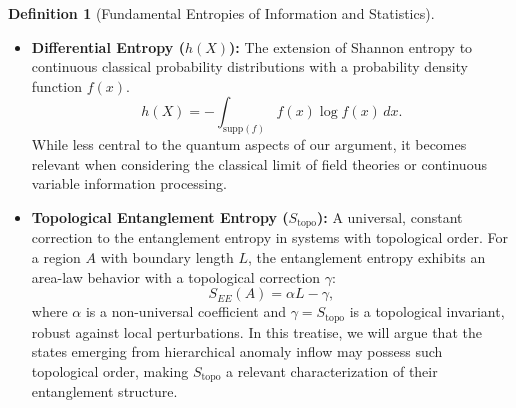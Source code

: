 \documentclass[11pt, letterpaper]{report}
\theoremstyle{plain} %
\theoremstyle{definition} %
\newtheorem{definition}{Definition}[chapter]
\theoremstyle{remark} %
\begin{document}
\begin{definition}[Fundamental Entropies of Information and Statistics]
\begin{itemize}
    \item \textbf{Differential Entropy ($h(X)$):} The extension of Shannon entropy to continuous classical probability distributions with a probability density function $f(x)$.
    \begin{equation}
        h(X) = -\int_{\text{supp}(f)} f(x) \log f(x) \, dx.
    \end{equation}
    While less central to the quantum aspects of our argument, it becomes relevant when considering the classical limit of field theories or continuous variable information processing.

    \item \textbf{Topological Entanglement Entropy ($S_{\text{topo}}$):} A universal, constant correction to the entanglement entropy in systems with topological order. For a region $A$ with boundary length $L$, the entanglement entropy exhibits an area-law behavior with a topological correction $\gamma$:
    \begin{equation}
        S_{EE}(A) = \alpha L - \gamma,
    \end{equation}
    where $\alpha$ is a non-universal coefficient and $\gamma = S_{\text{topo}}$ is a topological invariant, robust against local perturbations. In this treatise, we will argue that the states emerging from hierarchical anomaly inflow may possess such topological order, making $S_{\text{topo}}$ a relevant characterization of their entanglement structure.
\end{itemize}
\end{definition}
\end{document}
